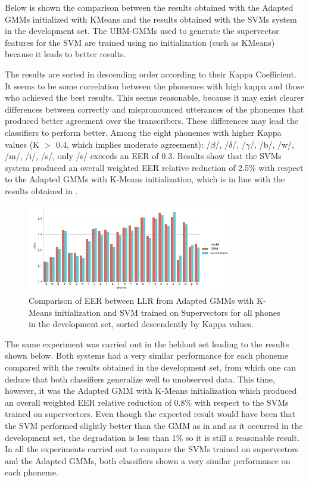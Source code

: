 Below is shown the comparison between the results obtained with the Adapted GMMs initialized
with KMeans and the results obtained with the SVMs system in the development set.
The UBM-GMMs used to generate the
supervector features for the SVM are trained using no initialization (such as KMeans) because
it leads to better results.

The results are sorted in descending order according to their Kappa Coefficient.
It seems to be some correlation between the phonemes with high kappa and those who achieved
the best results. This seems reasonable, because it may exist clearer differences
between correctly and mispronounced
utterances of the phonemes that produced better agreement over the transcribers.
These differences may lead the classifiers to perform better.
Among the eight phonemes with higher Kappa values (K $>$ 0.4, which implies moderate agreement):
/$\beta$/, /$\delta$/, /$\gamma$/, /b/, /w/, /m/, /i/, /s/, only /s/ exceeds an EER of 0.3.
Results show that the SVMs system produced an overall weighted EER relative reduction of 2.5\% with
respect to the Adapted GMMs with K-Means initialization, which is in line with the results obtained
in \cite{main}.

\begin{figure}[H]
	\centering
	\includegraphics[width=0.8\textwidth]{files/figures/results/gmm-vs-supervectors/gmm-vs-supervectors-dev.png}
	\caption{Comparison of EER between LLR from Adapted GMMs with K-Means initialization
	and SVM trained on Supervectors for all phones in the development set, sorted
	descendently by Kappa values.}
	\label{fig:gmmSupervectorsDev}
\end{figure}

The same experiment was carried out in the heldout set leading to the results shown below.
Both systems had a very similar performance for each phoneme compared with the results obtained
in the development set, from which one can deduce that both classifiers generalize well to
unobserved data. This time, however, it was the Adapted GMM with K-Means initialization
which produced an overall weighted EER relative reduction of 0.8\% with respect to the SVMs
trained on supervectors. Even though the expected result would have been that the SVM performed
slightly better than the GMM as in \cite{main} and as it occurred in the development set,
the degradation is less than 1\% so it is still a reasonable result. In all the experiments
carried out to compare the SVMs trained on supervectors and the Adapted GMMs, both classifiers
shown a very similar performance on each phoneme.

